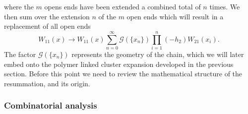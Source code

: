 where the $m$ opens ends have been extended a combined total of $n$ times. We
then sum over the extension $n$ of the $m$ open ends which will result in a
replacement of all open ends
%
\begin{equation} \label{eq:chain_subst}
  W_{11}(x) \to W_{11}(x) \sum_{n=0}^{\infty} \mathcal{G}(\{x_n\}) \prod_{i=1}^{n} (-h_2) W_{21}(x_i).
\end{equation}
%
The factor $\mathcal{G}(\{x_n\})$ represents the geometry of the chain, which we
will later embed onto the polymer linked cluster expansion developed in the
previous section. Before this point we need to review the mathematical structure
of the resummation, and its origin.

\subsubsection{Combinatorial analysis}

